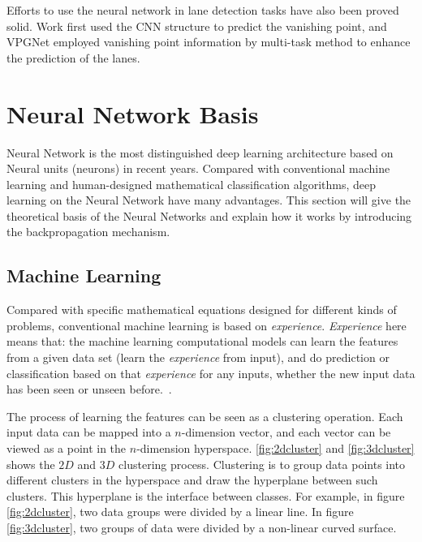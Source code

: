 \begin{spacing}{1.5}
Efforts to use the neural network in lane detection tasks have also been proved solid. Work \cite{borji2016vanishing} first used the CNN structure to predict the vanishing point, and VPGNet \cite{lee2017vpgnet} employed vanishing point information by multi-task method to enhance the prediction of the lanes.

\section{Neural Network Basis}
\label{sec:LR_NNB}

Neural Network is the most distinguished deep learning architecture based on Neural units (neurons) in recent years. Compared with conventional machine learning and human-designed mathematical classification algorithms, deep learning on the Neural Network have many advantages. This section will give the theoretical basis of the Neural Networks and explain how it works by introducing the backpropagation mechanism.

\subsection{Machine Learning}

Compared with specific mathematical equations designed for different kinds of problems, conventional machine learning is based on \textit{experience}. \textit{Experience} here means that: the machine learning computational models can learn the features from a given data set (learn the \textit{experience} from input), and do prediction or classification based on that \textit{experience} for any inputs, whether the new input data has been seen or unseen before.~\cite{mohri2018foundations}.

The process of learning the features can be seen as a clustering operation. Each input data can be mapped into a $n$-dimension vector, and each vector can be viewed as a point in the $n$-dimension hyperspace. \autoref{fig:2dcluster} and \autoref{fig:3dcluster} shows the $2D$ and $3D$ clustering process. Clustering is to group data points into different clusters in the hyperspace and draw the hyperplane between such clusters. This hyperplane is the interface between classes. For example, in figure \autoref{fig:2dcluster}, two data groups were divided by a linear line. In figure \autoref{fig:3dcluster}, two groups of data were divided by a non-linear curved surface.


\end{spacing}
